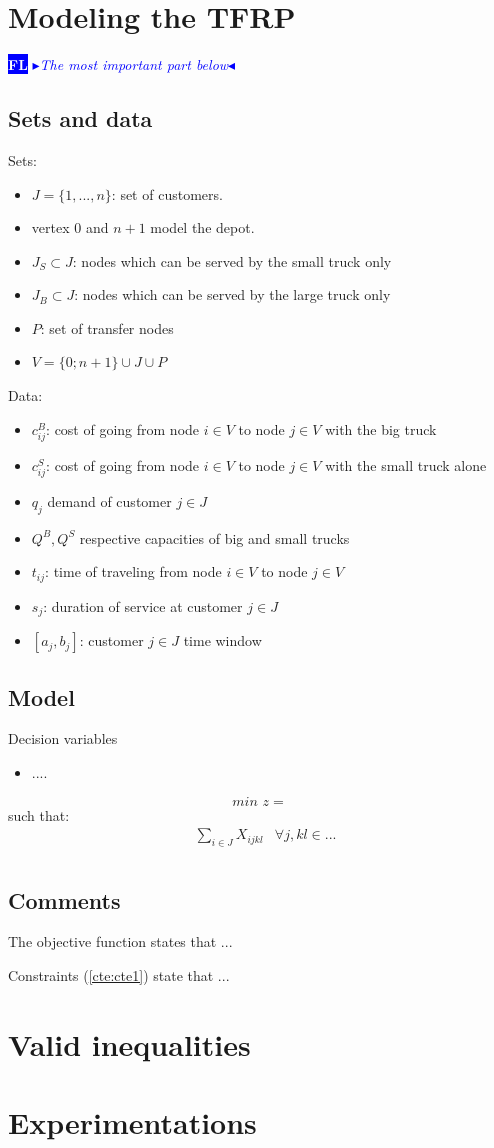 \documentclass[dvipsnames,authoryear,11pt]{article}
\newcommand{\nb}[3]{
	{\colorbox{#2}{\bfseries\sffamily\scriptsize\textcolor{white}{#1}}}
	{\textcolor{#2}{\sf\small$\blacktriangleright$\textit{#3}$\blacktriangleleft$}}}
\newcommand{\FL}[1]{\nb{FL}{blue}{#1}}
\newcommand{\refp}[1]{(\ref{#1})}
\begin{document}
	\section{Modeling the TFRP}
	
	\FL{The most important part below}
	
	\subsection{Sets and data}
	Sets: 
	\begin{itemize}
		\item $J=\{1,...,n\}$: set of customers.
		\item vertex $0$ and $n+1$ model the depot.
		\item $J_S \subset J$: nodes which can be served by the small truck only
		\item $J_B \subset J$: nodes which can be served by the large truck only
		\item $P$: set of transfer nodes 
		\item $V=\{0;n+1\} \cup J \cup P$
	\end{itemize}

	Data:
	\begin{itemize}
		\item $c_{ij}^B$: cost of going from node $i\in V$ to node $j \in V$ with the big truck
		\item $c_{ij}^S$: cost of going from node $i\in V$ to node $j \in V$ with the small truck alone
		\item $q_j$ demand of customer $j\in J$
		\item $Q^B, Q^S$ respective capacities of big and small trucks
		\item $t_{ij}$: time of traveling from node $i\in V$ to node $j \in V$
		\item $s_j$: duration of service at customer $j\in J$
		\item $[a_j,b_j]$: customer $j\in J$ time window
	\end{itemize}
	
\subsection{Model}	
	
Decision variables 
	\begin{itemize}
		\item ....
	\end{itemize}

	
	$$\textit{min }z=  \label{obj}$$
	such that:
	\begin{align}
		&\sum_{i \in J } X_{ijkl}& \forall j, k l \in ... \label{cte:cte1}\\
	\end{align}
	
\subsection{Comments}
 
The objective function states that ...

 
Constraints \refp{cte:cte1} state that ...


\section{Valid inequalities}

\section{Experimentations}
\end{document}
